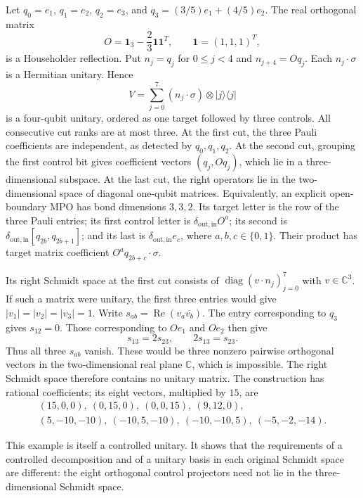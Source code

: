 \documentclass[11pt]{article}
\newcommand{\id}{\mathbf 1}
\begin{document}
Let $q_0=e_1$, $q_1=e_2$, $q_2=e_3$, and
$q_3=(3/5)e_1+(4/5)e_2$. The real orthogonal matrix
\[
 O=\id_3-\frac23\mathbf 1\mathbf 1^T,
 \qquad \mathbf 1=(1,1,1)^T,
\]
is a Householder reflection. Put $n_j=q_j$ for $0\leq j<4$ and
$n_{j+4}=Oq_j$. Each $n_j\cdot\sigma$ is a Hermitian unitary. Hence
\[
 V=\sum_{j=0}^7(n_j\cdot\sigma)\otimes|j\rangle\langle j|
\]
is a four-qubit unitary, ordered as one target followed by three controls.
All consecutive cut ranks are at most three. At the first cut, the
three Pauli coefficients are independent, as detected by $q_0,q_1,q_2$.
At the second cut, grouping the first control bit gives coefficient
vectors $(q_j,Oq_j)$, which lie in a three-dimensional subspace.
At the last cut, the right operators lie in the two-dimensional
space of diagonal one-qubit matrices.
Equivalently, an explicit open-boundary MPO has bond dimensions
$3,3,2$. Its target letter is the row of the three Pauli entries;
its first control letter is $\delta_{\mathrm{out},\mathrm{in}}O^a$;
its second is
$\delta_{\mathrm{out},\mathrm{in}}[q_{2b},q_{2b+1}]$;
and its last is $\delta_{\mathrm{out},\mathrm{in}}e_c$, where
$a,b,c\in\{0,1\}$. Their product has target matrix coefficient
$O^a q_{2b+c}\cdot\sigma$.

Its right Schmidt space at the first cut consists of
$\operatorname{diag}(v\cdot n_j)_{j=0}^7$ with $v\in\mathbb C^3$.
If such a matrix were unitary, the first three entries would give
$|v_1|=|v_2|=|v_3|=1$. Write
$s_{ab}=\operatorname{Re}(v_a\overline{v_b})$.
The entry corresponding to $q_3$ gives $s_{12}=0$.
Those corresponding to $Oe_1$ and $Oe_2$ then give
\[
 s_{13}=2s_{23},\qquad 2s_{13}=s_{23}.
\]
Thus all three $s_{ab}$ vanish. These would be three nonzero pairwise
orthogonal vectors in the two-dimensional real plane $\mathbb C$,
which is impossible. The right Schmidt space therefore contains
no unitary matrix. The construction has rational coefficients;
its eight vectors, multiplied by $15$, are
\[
\begin{gathered}
 (15,0,0),\ (0,15,0),\ (0,0,15),\ (9,12,0),\\
 (5,-10,-10),\ (-10,5,-10),\ (-10,-10,5),\ (-5,-2,-14).
\end{gathered}
\]

This example is itself a controlled unitary. It shows that the
requirements of a controlled decomposition and of a unitary basis
in each original Schmidt space are different: the eight orthogonal
control projectors need not lie in the three-dimensional Schmidt space.
\end{document}
